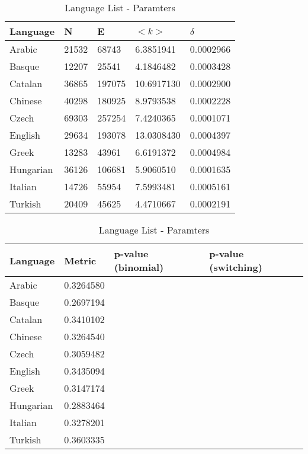 \documentclass[12pt, a4paper]{article}
\begin{document}
\begin{table}[H]
    \centering
    \begin{tabular}{l l l l l}
    Language & N & E & $<k>$ & $\delta$ \\
     \hline
    Arabic & 21532 & 68743 & 6.3851941 & 0.0002966 \\
    Basque & 12207 & 25541 & 4.1846482 & 0.0003428 \\
    Catalan & 36865 & 197075 & 10.6917130 & 0.0002900 \\
    Chinese & 40298 & 180925 & 8.9793538 & 0.0002228 \\
    Czech & 69303 & 257254 & 7.4240365 & 0.0001071 \\
    English & 29634 & 193078 & 13.0308430 & 0.0004397 \\
    Greek & 13283 & 43961 & 6.6191372 & 0.0004984 \\
    Hungarian & 36126 & 106681 & 5.9060510 & 0.0001635 \\
    Italian & 14726 & 55954 & 7.5993481 & 0.0005161 \\
    Turkish & 20409 & 45625 & 4.4710667 & 0.0002191 \\
    \end{tabular}
   \caption{Language List - Paramters}
   \label{table:1}
\end{table}

\begin{table}[H]
  \centering
  \begin{tabular}{l l l l}
  Language & Metric & p-value (binomial) & p-value (switching)\\
   \hline
   Arabic & 0.3264580  & & \\
   Basque & 0.2697194  & & \\
   Catalan & 0.3410102 & & \\
   Chinese & 0.3264540 & & \\
   Czech & 0.3059482 & & \\
   English & 0.3435094  & & \\
   Greek & 0.3147174  & & \\
   Hungarian & 0.2883464 & & \\
   Italian & 0.3278201 & & \\
   Turkish & 0.3603335  & & \\
     \end{tabular}
 \caption{Language List - Paramters}
 \label{table:1}
\end{table}

\end{document}
